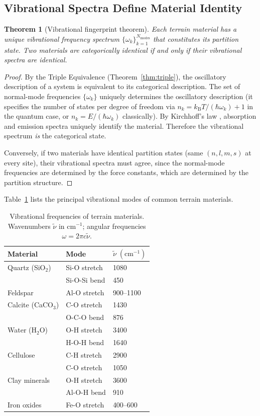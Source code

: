 \documentclass[10pt,twocolumn]{article}
\newtheorem{theorem}{Theorem}[section]
\theoremstyle{definition}
\theoremstyle{remark}
\newcommand{\kB}{k_{\mathrm{B}}}
\begin{document}
\subsection{Vibrational Spectra Define Material Identity}
\label{sec:vibspec}

\begin{theorem}[Vibrational fingerprint theorem]
\label{thm:fingerprint}
Each terrain material has a unique vibrational frequency
spectrum $\{\omega_k\}_{k=1}^{N_{\mathrm{modes}}}$ that
constitutes its partition state.  Two materials are
categorically identical if and only if their vibrational
spectra are identical.
\end{theorem}

\begin{proof}
By the Triple Equivalence (Theorem~\ref{thm:triple}), the
oscillatory description of a system is equivalent to its
categorical description.  The set of normal-mode frequencies
$\{\omega_k\}$ uniquely determines the oscillatory description
(it specifies the number of states per degree of freedom via
$n_k = \kB T/(\hbar\omega_k)+1$ in the quantum case, or
$n_k=E/(\hbar\omega_k)$ classically).  By Kirchhoff's law
\citep{Kirchhoff1860}, absorption and emission spectra uniquely
identify the material.  Therefore the vibrational spectrum
\emph{is} the categorical state.

Conversely, if two materials have identical partition states
(same $(n,l,m,s)$ at every site), their vibrational spectra
must agree, since the normal-mode frequencies are determined by
the force constants, which are determined by the partition
structure.
\end{proof}

Table~\ref{tab:vibrations} lists the principal vibrational
modes of common terrain materials.

\begin{table}[H]
\centering
\caption{Vibrational frequencies of terrain materials.
Wavenumbers $\tilde{\nu}$ in $\mathrm{cm^{-1}}$; angular
frequencies $\omega = 2\pi c\tilde{\nu}$.}
\label{tab:vibrations}
\begin{tabular}{@{}lll@{}}
\toprule
\textbf{Material} & \textbf{Mode} &
$\tilde{\nu}\;(\mathrm{cm^{-1}})$ \\
\midrule
Quartz (SiO$_2$) & Si-O stretch & 1080 \\
 & Si-O-Si bend & 450 \\
Feldspar & Al-O stretch & 900--1100 \\
Calcite (CaCO$_3$) & C-O stretch & 1430 \\
 & O-C-O bend & 876 \\
Water (H$_2$O) & O-H stretch & 3400 \\
 & H-O-H bend & 1640 \\
Cellulose & C-H stretch & 2900 \\
 & C-O stretch & 1050 \\
Clay minerals & O-H stretch & 3600 \\
 & Al-O-H bend & 910 \\
Iron oxides & Fe-O stretch & 400--600 \\
\bottomrule
\end{tabular}
\end{table}
\end{document}
